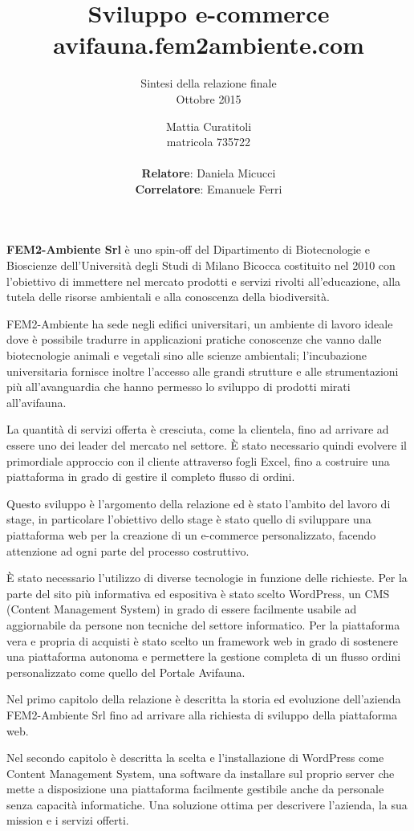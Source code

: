 \documentclass[12pt,a4paper]{scrartcl}
\author{
	Mattia Curatitoli \\ 
	matricola 735722 \\
	\\
	\textbf{Relatore}: Daniela Micucci \\
	\textbf{Correlatore}: Emanuele Ferri
}
\title{Sviluppo e-commerce avifauna.fem2ambiente.com}
\subtitle{
	Sintesi della relazione finale \\
 	Ottobre 2015
}
\date{}
\def \unimib {Università degli Studi di Milano Bicocca}
\def \fem {FEM2-Ambiente}
\def \femsrl {FEM2-Ambiente Srl}
\def \wp {WordPress}
\begin{document}
\maketitle


\textbf{\femsrl} è uno spin-off del Dipartimento di Biotecnologie e Bioscienze dell'{\unimib} costituito nel 2010 con l'obiettivo di immettere nel mercato prodotti e servizi rivolti all'educazione, alla tutela delle risorse ambientali e alla conoscenza della biodiversità. 

{\fem} ha sede negli edifici universitari, un ambiente di lavoro ideale dove è possibile tradurre in applicazioni pratiche conoscenze che vanno dalle biotecnologie animali e vegetali sino alle scienze ambientali; l'incubazione universitaria fornisce inoltre l'accesso alle grandi strutture e alle strumentazioni più all'avanguardia che hanno permesso lo sviluppo di prodotti mirati all'avifauna. 

La quantità di servizi offerta è cresciuta, come la clientela, fino ad arrivare ad essere uno dei leader del mercato nel settore. È stato necessario quindi evolvere il primordiale approccio con il cliente attraverso fogli Excel, fino a costruire una piattaforma in grado di gestire il completo flusso di ordini.

Questo sviluppo è l'argomento della relazione ed è stato l'ambito del lavoro di stage, in particolare l'obiettivo dello stage è stato quello di sviluppare una piattaforma web per la creazione di un e-commerce personalizzato, facendo attenzione ad ogni parte del processo costruttivo.

È stato necessario l'utilizzo di diverse tecnologie in funzione delle richieste. Per la parte del sito più informativa ed espositiva è stato scelto {\wp}, un CMS (Content Management System) in grado di essere facilmente usabile ad aggiornabile da persone non tecniche del settore informatico. Per la piattaforma vera e propria di acquisti è stato scelto un framework web in grado di sostenere una piattaforma autonoma e permettere la gestione completa di un flusso ordini personalizzato come quello del Portale Avifauna.
  
Nel primo capitolo della relazione è descritta la storia ed evoluzione dell'azienda {\femsrl} fino ad arrivare alla richiesta di sviluppo della piattaforma web. 

Nel secondo capitolo è descritta la scelta e l'installazione di {\wp} come Content Management System, una software da installare sul proprio server che mette a disposizione una piattaforma facilmente gestibile anche da personale senza capacità informatiche. Una soluzione ottima per descrivere l'azienda, la sua mission e i servizi offerti.
\end{document}
